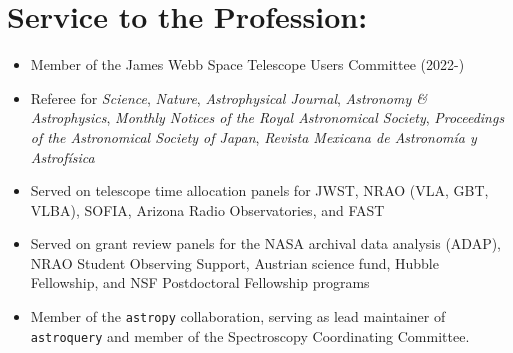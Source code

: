 
\begin{minipage}{\textwidth}
\setlength{\extrarowheight}{4pt}
\section*{Service to the Profession:}
\vspace{-10pt}
\begin{itemize}
\itemsep-3pt
        
    \item Member of the James Webb Space Telescope Users Committee (2022-)
    \item Referee for 
            \textit{Science},
            \textit{Nature},
            \textit{Astrophysical Journal},
            \textit{Astronomy \& Astrophysics},
            \textit{Monthly Notices of the Royal Astronomical Society},
            \textit{Proceedings of the Astronomical Society of Japan},
            \textit{Revista Mexicana de Astronom{\'i}a y Astrof{\'i}sica}
    \item Served on telescope time allocation panels for JWST, NRAO (VLA, GBT,
        VLBA), SOFIA, Arizona Radio Observatories, and FAST
    \item Served on grant review panels for the NASA archival data analysis (ADAP), 
        NRAO Student Observing Support,
        Austrian science fund,
        Hubble Fellowship,
        and NSF Postdoctoral Fellowship programs
    \item Member of the \texttt{astropy} collaboration, serving as lead maintainer
        of \texttt{astroquery} and member of the Spectroscopy Coordinating Committee.
\end{itemize}


\end{minipage}
